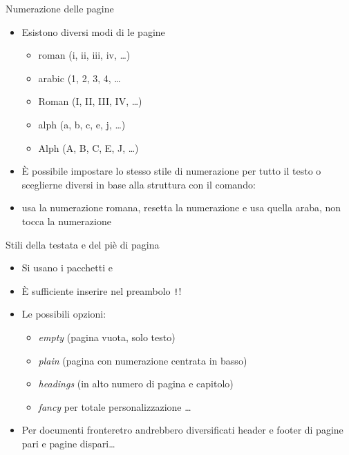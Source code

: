 \documentclass{beamer}
\begin{document}
\begin{frame}{Numerazione delle pagine}
\begin{itemize}
\item Esistono diversi modi di  le pagine
\begin{itemize}
\item roman (i, ii, iii, iv, \ldots)
\item arabic (1, 2, 3, 4, \ldots
\item Roman (I, II, III, IV, \ldots)
\item alph (a, b, c, e, j, \ldots)
\item Alph (A, B, C, E, J, \ldots)
\end{itemize}
\item \`E possibile impostare lo stesso stile di numerazione per tutto il testo o sceglierne diversi in base alla struttura con il comando:
\begin{center}
\Large{}
\end{center}
\item {} usa la numerazione romana,  resetta la numerazione e usa quella araba,  non tocca la numerazione
\end{itemize}
\end{frame}

\begin{frame}[fragile]{Stili della testata e del pi\`e di pagina}

\begin{itemize}
\item Si usano i pacchetti  e 
\item \`E sufficiente inserire nel preambolo \texttt!\pagestyle{stile}!
\item Le possibili opzioni:
\begin{itemize}
\item \emph{empty} (pagina vuota, solo testo)
\item \emph{plain} (pagina con numerazione centrata in basso)
\item \emph{headings }(in alto numero di pagina e capitolo)
\item \emph{fancy} per totale personalizzazione \ldots
\end{itemize}
\item Per documenti fronteretro andrebbero diversificati header e footer di pagine pari e pagine dispari\ldots
\end{itemize}
\end{frame}
\end{document}
